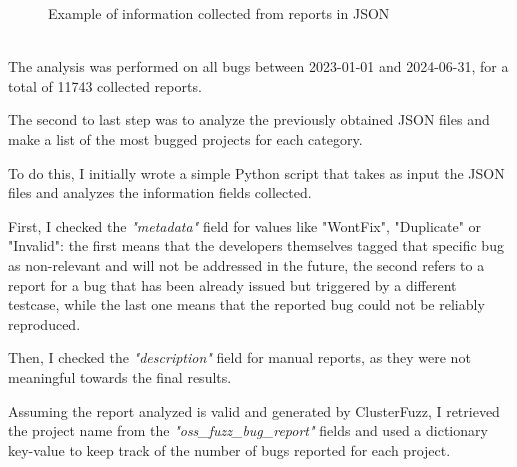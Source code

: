 \begin{figure}[h]
\caption{Example of information collected from reports in JSON}
\label{fig:report}
\end{figure}
\ \\
The analysis was performed on all bugs between 2023-01-01 and 2024-06-31, for a total of 11743 collected reports.


The second to last step was to analyze the previously obtained JSON files and make a list of the most bugged projects for each category.

To do this, I initially wrote a simple Python script that takes as input the JSON files and analyzes the information fields collected.

First, I checked the \textit{"metadata"} field for values like "WontFix", "Duplicate" or "Invalid": the first means that the developers themselves tagged that specific bug as non-relevant and will not be addressed in the future, the second refers to a report for a bug that has been already issued but triggered by a different testcase, while the last one means that the reported bug could not be reliably reproduced.

Then, I checked the \textit{"description"} field for manual reports, as they were not meaningful towards the final results. 

Assuming the report analyzed is valid and generated by ClusterFuzz, I retrieved the project name from the \textit{"oss\_fuzz\_bug\_report"} fields and used a dictionary key-value to keep track of the number of bugs reported for each project. 

